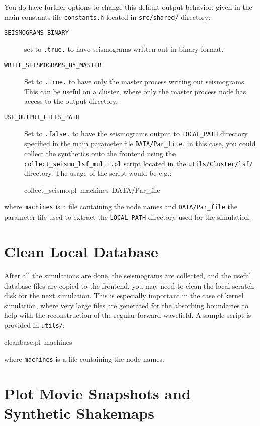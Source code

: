 You do have further options to change this default output behavior,
given in the main constants file \texttt{constants.h} located in \texttt{src/shared/}
directory:
\begin{description}
\item [{\texttt{SEISMOGRAMS\_BINARY}}] set to \texttt{.true.} to have seismograms
written out in binary format.
\item [{\texttt{WRITE\_SEISMOGRAMS\_BY\_MASTER}}] Set to \texttt{.true.}
to have only the master process writing out seismograms. This can
be useful on a cluster, where only the master process node has access
to the output directory.
\item [{\texttt{USE\_OUTPUT\_FILES\_PATH}}] Set to \texttt{.false.} to
have the seismograms output to \texttt{LOCAL\_PATH} directory specified
in the main parameter file \texttt{DATA/Par\_file}. In this case,
you could collect the synthetics onto the frontend using the \texttt{collect\_seismo\_lsf\_multi.pl}
script located in the \texttt{utils/Cluster/lsf/} directory. The usage
of the script would be e.g.:

\begin{lyxcode}
collect\_seismo.pl~machines~DATA/Par\_file
\end{lyxcode}
\end{description}
where \texttt{machines} is a file containing the node names and \texttt{DATA/Par\_file}
the parameter file used to extract the \texttt{LOCAL\_PATH} directory
used for the simulation.


\section{Clean Local Database}

After all the simulations are done, the seismograms are collected,
and the useful database files are copied to the frontend, you may
need to clean the local scratch disk for the next simulation. This
is especially important in the case of kernel simulation, where very
large files are generated for the absorbing boundaries to help with
the reconstruction of the regular forward wavefield. A sample script
is provided in \texttt{utils/}:
\begin{lyxcode}
cleanbase.pl~machines
\end{lyxcode}
where \texttt{machines} is a file containing the node names.


\section{Plot Movie Snapshots and Synthetic Shakemaps}


